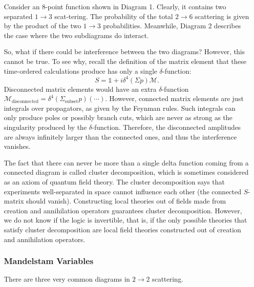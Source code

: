 \documentclass[11pt]{article}
\theoremstyle{definition}
\begin{document}
Consider an 8-point function shown in Diagram 1. Clearly, it contains two separated $1\rightarrow3$ scat-tering. The probability of the total $2\rightarrow6$ scattering is given by the product of the two $1\rightarrow3$ probabilities. Meanwhile, Diagram 2 describes the case where the two subdiagrams do interact.

So, what if there could be interference between the two diagrams? However, this cannot be true. To see why, recall the definition of the matrix element that these time-ordered calculations produce has only a single $\delta$-function:
\begin{equation}
    S = \mathds{1} + i\delta^4(\Sigma p)\mathcal{M}.
\end{equation}
Disconnected matrix elements would have an extra $\delta$-function $\mathcal{M}_\text{disconnected} = \delta^4(\Sigma_\text{subset}p)(\cdots)$. However, connected matrix elements are just integrals over propagators, as given by the Feynman rules. Such integrals can only produce poles or possibly branch cuts, which are never as strong as the singularity produced by the $\delta$-function. Therefore, the disconnected amplitudes are always infinitely larger than the connected ones, and thus the interference vanishes. 

The fact that there can never be more than a single delta function coming from a connected diagram is called cluster decomposition, which is sometimes considered as an axiom of quantum field theory. The cluster decomposition says that experiments well-separated in space cannot influence each other (the connected $S$-matrix should vanish). Constructing local theories out of fields made from creation and annihilation operators guarantees cluster decomposition. However, we do not know if the logic is invertible, that is, if the only possible theories that satisfy cluster decomposition are local field theories constructed out of creation and annihilation operators.

\subsubsection{Mandelstam Variables}
There are three very common diagrams in $2 \rightarrow 2$ scattering. 
\end{document}
